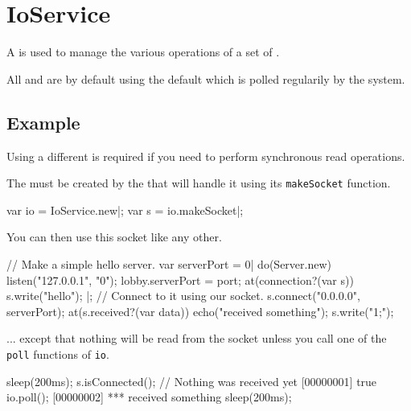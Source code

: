 
\section{IoService}

A  is used to manage the various operations of a set of
.

All  and  are by default using the
default  which is polled regularily by the system.

\subsection{Example}

Using a different  is required if you need to perform
synchronous read operations.

The  must be created by the  that will
handle it using its \lstinline|makeSocket| function.

\begin{urbiscript}
var io = IoService.new|;
var s = io.makeSocket|;
\end{urbiscript}

You can then use this socket like any other.

\begin{urbiscript}
// Make a simple hello server.
var serverPort = 0|
do(Server.new)
{
  listen("127.0.0.1", "0");
  lobby.serverPort = port;
  at(connection?(var s))
  {
    s.write("hello");
  }
}|;
// Connect to it using our socket.
s.connect("0.0.0.0", serverPort);
at(s.received?(var data))
  echo("received something");
s.write("1;");
\end{urbiscript}

... except that nothing will be read from the socket unless you call one of the
\lstinline|poll| functions of \lstinline|io|.

\begin{urbiscript}
sleep(200ms);
s.isConnected(); // Nothing was received yet
[00000001] true
io.poll();
[00000002] *** received something
sleep(200ms);
\end{urbiscript}

